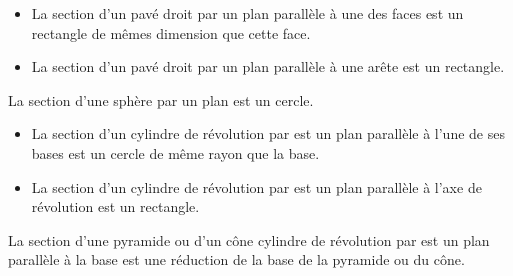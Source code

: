 \begin{propriete}
   \begin{itemize}
      \item La section d'un pavé droit par un plan parallèle à une des faces est un rectangle de mêmes dimension que cette face.
      \item La section d'un pavé droit par un plan parallèle à une arête est un rectangle. \\ [-8mm]
   \end{itemize}
\end{propriete}

\begin{propriete}
   La section d'une sphère par un plan est un cercle.
\end{propriete}

\begin{propriete}
   \begin{itemize}
      \item La section d'un cylindre de révolution par est un plan parallèle à l'une de ses bases est un cercle de même rayon que la base.
      \item La section d'un cylindre de révolution par est un plan parallèle à l'axe de révolution est un rectangle. \\ [-8mm]
   \end{itemize}
\end{propriete}

\begin{propriete}
   La section d'une pyramide ou d'un cône cylindre de révolution par est un plan parallèle à la base est une réduction de la base de la pyramide ou du cône.
\end{propriete}

